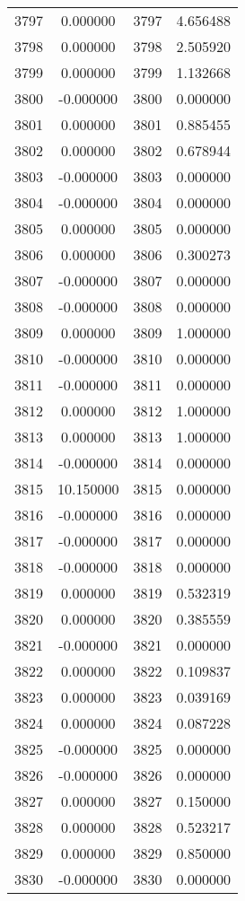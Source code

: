 \documentclass[12pt]{article}
\begin{document}
\begin{longtable}{@{}cccc@{}}
3797 & 0.000000 & 3797 & 4.656488 \\
3798 & 0.000000 & 3798 & 2.505920 \\
3799 & 0.000000 & 3799 & 1.132668 \\
3800 & -0.000000 & 3800 & 0.000000 \\
3801 & 0.000000 & 3801 & 0.885455 \\
3802 & 0.000000 & 3802 & 0.678944 \\
3803 & -0.000000 & 3803 & 0.000000 \\
3804 & -0.000000 & 3804 & 0.000000 \\
3805 & 0.000000 & 3805 & 0.000000 \\
3806 & 0.000000 & 3806 & 0.300273 \\
3807 & -0.000000 & 3807 & 0.000000 \\
3808 & -0.000000 & 3808 & 0.000000 \\
3809 & 0.000000 & 3809 & 1.000000 \\
3810 & -0.000000 & 3810 & 0.000000 \\
3811 & -0.000000 & 3811 & 0.000000 \\
3812 & 0.000000 & 3812 & 1.000000 \\
3813 & 0.000000 & 3813 & 1.000000 \\
3814 & -0.000000 & 3814 & 0.000000 \\
3815 & 10.150000 & 3815 & 0.000000 \\
3816 & -0.000000 & 3816 & 0.000000 \\
3817 & -0.000000 & 3817 & 0.000000 \\
3818 & -0.000000 & 3818 & 0.000000 \\
3819 & 0.000000 & 3819 & 0.532319 \\
3820 & 0.000000 & 3820 & 0.385559 \\
3821 & -0.000000 & 3821 & 0.000000 \\
3822 & 0.000000 & 3822 & 0.109837 \\
3823 & 0.000000 & 3823 & 0.039169 \\
3824 & 0.000000 & 3824 & 0.087228 \\
3825 & -0.000000 & 3825 & 0.000000 \\
3826 & -0.000000 & 3826 & 0.000000 \\
3827 & 0.000000 & 3827 & 0.150000 \\
3828 & 0.000000 & 3828 & 0.523217 \\
3829 & 0.000000 & 3829 & 0.850000 \\
3830 & -0.000000 & 3830 & 0.000000 \\

\end{longtable}
\end{document}
